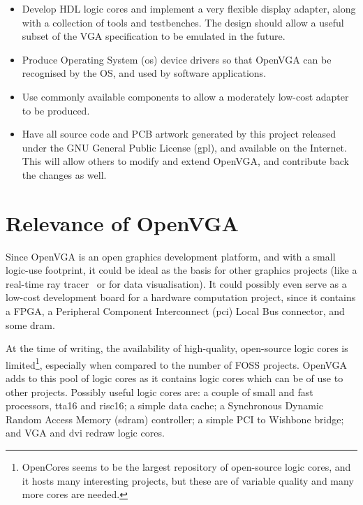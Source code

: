 \begin{itemize}
  \item Develop HDL logic cores and implement a very flexible display
  adapter, along with a collection of tools and testbenches. The design should
  allow a useful subset of the VGA specification to be emulated in the future.
  \item Produce Operating System (\gls{os}) device drivers so that OpenVGA can be recognised by the OS, and
  used by software applications.
  \item Use commonly available components to allow a moderately low-cost adapter
  to be produced.
  \item Have all source code and PCB artwork generated by this project released
  under the GNU General Public License (\gls{gpl}), and available on the
  Internet. This will allow others to modify and extend OpenVGA, and
  contribute back the changes as well.
\end{itemize}


\section{Relevance of OpenVGA}
Since OpenVGA is an open graphics development platform, and with a small
logic-use footprint, it could be ideal as the basis for other graphics projects
(like a real-time ray tracer~\cite{TTA_Ray_Trace} or for data visualisation). It
could possibly even serve as a low-cost development board for a hardware
computation project, since it contains a FPGA, a Peripheral Component
Interconnect (\gls{pci}) Local Bus connector, and some \gls{dram}.

At the time of writing, the availability of high-quality, open-source logic cores
is limited\footnote{OpenCores seems to be the largest repository of open-source
logic cores, and it hosts many interesting projects, but these are of variable
quality and many more cores are needed.}, especially when compared to the number
of FOSS projects. OpenVGA adds to this pool of logic cores as it contains logic
cores which can be of use to other projects. Possibly useful logic cores are: a
couple of small and fast processors, \gls{tta16} and \gls{risc16}; a simple data cache; a Synchronous
Dynamic Random Access Memory (\gls{sdram}) controller; a simple PCI to Wishbone bridge; and VGA and
\gls{dvi} redraw logic
cores.


